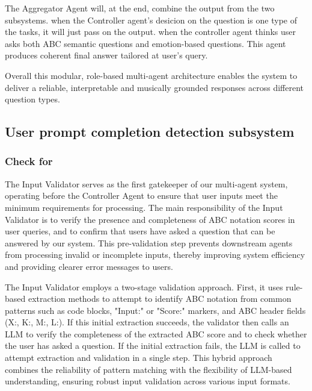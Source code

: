 \documentclass[sigconf]{acmart}
\begin{document}
The Aggregator Agent will, at the end, combine the output from the two subsystems. when the Controller agent's desicion on the question is one type of the tasks, it will just pass on the output. when the controller agent thinks user asks both ABC semantic questions and emotion-based questions. This agent produces coherent final answer tailored at user’s query. 

Overall this modular, role-based multi-agent architecture enables the system to deliver a reliable, interpretable and musically grounded responses across different question types. 

\subsection{User prompt completion detection subsystem}
\subsubsection{Check for}
The Input Validator serves as the first gatekeeper of our multi-agent system, operating before the Controller Agent to ensure that user inputs meet the minimum requirements for processing. The main responsibility of the Input Validator is to verify the presence and completeness of ABC notation scores in user queries, and to confirm that users have asked a question that can be answered by our system. This pre-validation step prevents downstream agents from processing invalid or incomplete inputs, thereby improving system efficiency and providing clearer error messages to users.

The Input Validator employs a two-stage validation approach. First, it uses rule-based extraction methods to attempt to identify ABC notation from common patterns such as code blocks, "Input:" or "Score:" markers, and ABC header fields (X:, K:, M:, L:). If this initial extraction succeeds, the validator then calls an LLM to verify the completeness of the extracted ABC score and to check whether the user has asked a question. If the initial extraction fails, the LLM is called to attempt extraction and validation in a single step. This hybrid approach combines the reliability of pattern matching with the flexibility of LLM-based understanding, ensuring robust input validation across various input formats.
\end{document}
